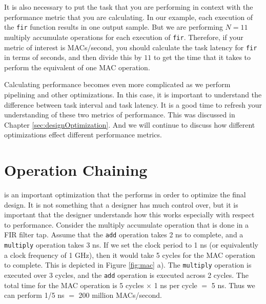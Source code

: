 It is also necessary to put the task that you are performing in context with the performance metric that you are calculating. In our example, each execution of the \lstinline{fir} function results in one output sample. But we are performing $N = 11$ multiply accumulate operations for each execution of \lstinline{fir}. Therefore, if your metric of interest is MACs/second, you should calculate the task latency for \lstinline{fir} in terms of seconds, and then divide this by $11$ to get the time that it takes to perform the equivalent of one MAC operation. 

Calculating performance becomes even more complicated as we perform pipelining and other optimizations. In this case, it is important to understand the difference between task interval and task latency. It is a good time to refresh your understanding of these two metrics of performance. This was discussed in Chapter \ref{sec:designOptimization}. And we will continue to discuss how different optimizations effect different performance metrics.

\section{Operation Chaining}
\label{sec:fir-chaining}

 is an important optimization that the \VHLS performs in order to optimize the final design. It is not something that a designer has much control over, but it is important that the designer understands how this works especially with respect to performance. Consider the multiply accumulate operation that is done in a FIR filter tap. Assume that the \lstinline{add} operation takes 2 ns to complete, and a \lstinline{multiply} operation takes 3 ns. If we set the clock period to 1 ns (or equivalently a clock frequency of 1 GHz), then it would take 5 cycles for the MAC operation to complete. This is depicted in Figure \ref{fig:mac} a). The \lstinline{multiply} operation is executed over 3 cycles, and the \lstinline{add} operation is executed across 2 cycles. The total time for the MAC operation is 5 cycles $\times$ 1 ns per cycle $=$ 5 ns. Thus we can perform 1/5 ns $=$ 200 million MACs/second. 

